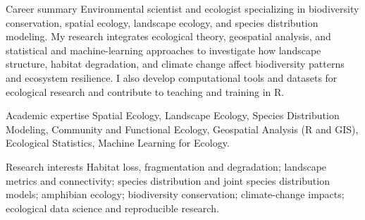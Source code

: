\documentclass{resume}
\begin{document}
\begin{rSection}{Career summary}
Environmental scientist and ecologist specializing in biodiversity conservation, spatial ecology, landscape ecology, and species distribution modeling. My research integrates ecological theory, geospatial analysis, and statistical and machine-learning approaches to investigate how landscape structure, habitat degradation, and climate change affect biodiversity patterns and ecosystem resilience. I also develop computational tools and datasets for ecological research and contribute to teaching and training in R.
\end{rSection}

\begin{rSection}{Academic expertise}
Spatial Ecology, Landscape Ecology, Species Distribution Modeling, Community and Functional Ecology, Geospatial Analysis (R and GIS), Ecological Statistics, Machine Learning for Ecology.
\end{rSection}

\begin{rSection}{Research interests}
Habitat loss, fragmentation and degradation; landscape metrics and connectivity; species distribution and joint species distribution models; amphibian ecology; biodiversity conservation; climate-change impacts; ecological data science and reproducible research.
\end{rSection}
\end{document}
